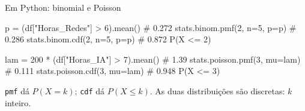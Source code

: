 \documentclass[aspectratio=169, 10pt, t]{beamer}
\newcommand{\code}[1]{\texttt{\color{emascindigo}#1}}
\newcommand{\tip}[2]{%
\begin{tcolorbox}[enhanced, colback=emascmist, colframe=emascmist, boxrule=0pt,
arc=2.5pt, left=11pt, right=9pt, top=5pt, bottom=5pt,
borderline west={3.5pt}{0pt}{#1}, fontupper=\small,
before skip=4pt, after skip=2pt]#2\end{tcolorbox}}
\begin{document}
\begin{frame}[fragile]{Em Python: binomial e Poisson}
\begin{pycode}
p = (df["Horas_Redes"] > 6).mean()          # 0.272
stats.binom.pmf(2, n=5, p=p)                # 0.286
stats.binom.cdf(2, n=5, p=p)                # 0.872  P(X <= 2)

lam = 200 * (df["Horas_IA"] > 7).mean()     # 1.39
stats.poisson.pmf(3, mu=lam)                # 0.111
stats.poisson.cdf(3, mu=lam)                # 0.948  P(X <= 3)
\end{pycode}
\tip{emascsky}{\code{pmf} dá $P(X=k)$; \code{cdf} dá $P(X\le k)$. As duas distribuições são discretas: $k$ inteiro.}
\end{frame}

\newcommand{\resrow}[7]{%
\begin{tcolorbox}[enhanced, colback=emascmist, colframe=#1, boxrule=0pt, arc=3pt,
left=6pt, right=6pt, top=2pt, bottom=2pt, before skip=2.5pt, after skip=0pt,
borderline west={3.5pt}{0pt}{#1}]
\begin{minipage}[c]{.35\linewidth}
{\bfseries\color{#1!85!black}#2.\ #3}\par{\scriptsize\itshape\color{softgray}#4}
\end{minipage}\hfill
\begin{minipage}[c]{.32\linewidth}\raggedright
{\footnotesize #5}\par\vspace{1pt}{\scriptsize #6}
\end{minipage}\hfill
\begin{minipage}[c]{.25\linewidth}\raggedleft
{\footnotesize\bfseries\color{#1!85!black}#7}
\end{minipage}
\end{tcolorbox}}
\end{document}
